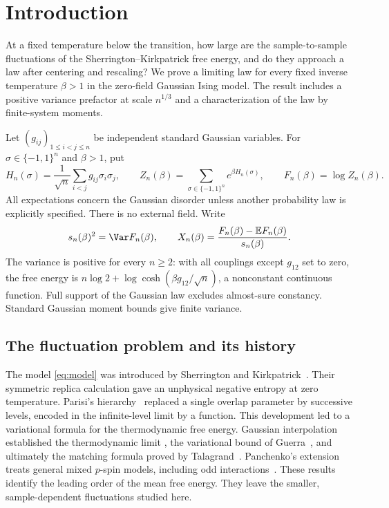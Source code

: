 \section{Introduction}\label{sec:introduction}

At a fixed temperature below the transition, how large are the
sample-to-sample fluctuations of the Sherrington--Kirkpatrick free
energy, and do they approach a law after centering and rescaling?
We prove a limiting law for every fixed inverse temperature $\beta>1$
in the zero-field Gaussian Ising model. The result includes a positive
variance prefactor at scale $n^{1/3}$ and a characterization of the
law by finite-system moments.

Let $(g_{ij})_{1\le i<j\le n}$ be independent standard Gaussian variables. For $\sigma\in\{-1,1\}^n$ and $\beta>1$, put
\begin{equation}\label{eq:model}
 H_n(\sigma)=\frac1{\sqrt n}\sum_{i<j}g_{ij}\sigma_i\sigma_j,
 \qquad Z_n(\beta)=\sum_{\sigma\in\{-1,1\}^n}e^{\beta H_n(\sigma)},
 \qquad F_n(\beta)=\log Z_n(\beta).
\end{equation}
All expectations concern the Gaussian disorder unless another probability law is explicitly specified. There is no external field. Write
\[
 s_n(\beta)^2=\Var F_n(\beta),
 \qquad X_n(\beta)=\frac{F_n(\beta)-\mathbb E F_n(\beta)}{s_n(\beta)}.
\]
The variance is positive for every $n\ge2$: with all couplings except $g_{12}$ set to zero, the free energy is $n\log2+\log\cosh(\beta g_{12}/\sqrt n)$, a nonconstant continuous function. Full support of the Gaussian law excludes almost-sure constancy. Standard Gaussian moment bounds give finite variance.

\subsection{The fluctuation problem and its history}

The model \eqref{eq:model} was introduced by Sherrington and
Kirkpatrick~\cite{SK1975}. Their symmetric replica calculation gave
an unphysical negative entropy at zero temperature. Parisi's
hierarchy~\cite{Parisi1979} replaced a single overlap parameter by
successive levels, encoded in the infinite-level limit by a function.
This development led to a variational formula for the thermodynamic
free energy.
Gaussian interpolation established the thermodynamic limit
\cite{GuerraToninelli2002}, the variational bound of
Guerra~\cite{Guerra2003}, and ultimately the matching formula proved by
Talagrand~\cite{Talagrand2006}. Panchenko's extension treats general
mixed $p$-spin models, including odd interactions~\cite{Panchenko2014}. These results identify the
leading order of the mean free energy. They leave the smaller,
sample-dependent fluctuations studied here.

